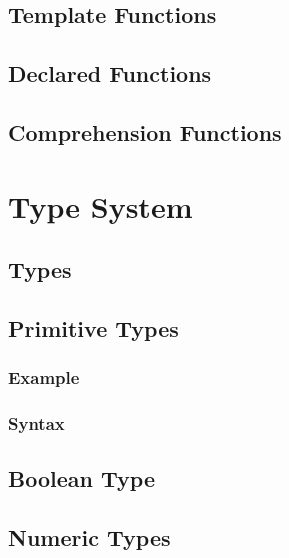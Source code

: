 \documentclass[a4paper,oneside,12pt, extrafontsizes]{memoir}
\begin{document}
  \chapter{Template Functions}
  \label{ch:template-functions}
  

  \chapter{Declared Functions}
  \label{ch:declared-functions}
  

  \chapter{Comprehension Functions}
  \label{ch:comprehension-functions}
  

\part{Type System}

  \chapter{Types}
  \label{ch:types}
  

  \chapter{Primitive Types}
  \label{ch:primitive-types}
  

    \section{Example}
    

    \section{Syntax}
    

  \chapter{Boolean Type}
  \label{ch:boolean}
  

  \chapter{Numeric Types}
  \label{ch:numeric-types}
  
\end{document}
